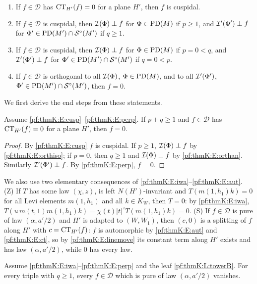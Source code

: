 \begin{enumerate}[label=(E\arabic*)]
\item\label{pf:thmK:E:cusp} If $f\in\mathcal D$ has $\operatorname{CT}_{H'}(f)=0$ for a plane $H'$, then $f$ is cuspidal.
\item\label{pf:thmK:E:orthiso} If $f\in\mathcal D$ is cuspidal, then $\mathcal{I}(\Phi)\perp f$ for $\Phi\in\operatorname{PD}(M)$ if $p\ge1$,
and $\mathcal{I}'(\Phi')\perp f$ for $\Phi'\in\operatorname{PD}(M')\cap\mathcal{S}^{\circ}(M')$ if $q\ge1$.
\item\label{pf:thmK:E:orthan} If $f\in\mathcal D$ is cuspidal, then $\mathcal{I}(\Phi)\perp f$ for $\Phi\in\operatorname{PD}(M)$ if $p=0<q$,
and $\mathcal{I}'(\Phi')\perp f$ for $\Phi'\in\operatorname{PD}(M')\cap\mathcal{S}^{\circ}(M')$ if $q=0<p$.
\item\label{pf:thmK:E:perp} If $f\in\mathcal D$ is orthogonal to all $\mathcal{I}(\Phi)$, $\Phi\in\operatorname{PD}(M)$, and to all
$\mathcal{I}'(\Phi')$, $\Phi'\in\operatorname{PD}(M')\cap\mathcal{S}^{\circ}(M')$, then $f=0$.
\end{enumerate}

We first derive the end steps from these statements.

\begin{lemma}\label{pf:thmK:zeroline}
Assume \ref{pf:thmK:E:cusp}--\ref{pf:thmK:E:perp}. If $p+q\ge1$ and $f\in\mathcal D$ has $\operatorname{CT}_{H'}(f)=0$ for a plane
$H'$, then $f=0$.
\end{lemma}

\begin{proof}
By \ref{pf:thmK:E:cusp} $f$ is cuspidal. If $p\ge1$, $\mathcal{I}(\Phi)\perp f$ by \ref{pf:thmK:E:orthiso}; if $p=0$, then $q\ge1$
and $\mathcal{I}(\Phi)\perp f$ by \ref{pf:thmK:E:orthan}. Similarly $\mathcal{I}'(\Phi')\perp f$. By \ref{pf:thmK:E:perp}, $f=0$.
\end{proof}

We also use two elementary consequences of \ref{pf:thmK:E:iwa}--\ref{pf:thmK:E:aut}. (Z) If $T$ has some law $(\chi,z)$, is
left $N(H')$-invariant and $T(m(1,h_1)k)=0$ for all Levi elements $m(1,h_1)$ and all $k\in K_W$, then $T=0$: by
\ref{pf:thmK:E:iwa}, $T(u\,m(t,1)m(1,h_1)k)=\chi(t)|t|^zT(m(1,h_1)k)=0$. (S) If $f\in\mathcal D$ is pure of law
$(\alpha,a'/2)$ and $H'$ is adapted to $(W,W_1)$, then $(c,0)$ is a splitting of $f$ along $H'$ with
$c=\operatorname{CT}_{H'}(f)$: $f$ is automorphic by \ref{pf:thmK:E:aut} and \ref{pf:thmK:E:ct}, so by \ref{pf:thmK:E:linemove} its
constant term along $H'$ exists and has law $(\alpha,a'/2)$, while $0$ has every law.

\begin{lemma}\label{pf:thmK:sumb}
Assume \ref{pf:thmK:E:iwa}--\ref{pf:thmK:E:perp} and the leaf \ref{pf:thmK:L:towerB}. For every triple with $q\ge1$, every
$f\in\mathcal D$ which is pure of law $(\alpha,a'/2)$ vanishes.
\end{lemma}


